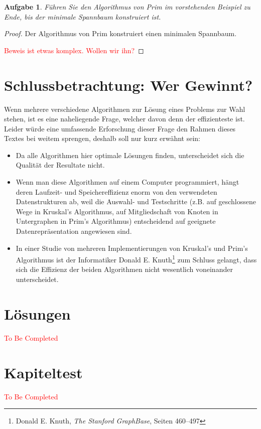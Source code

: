 \documentclass[12pt,a4paper]{report}
\theoremstyle{break}
\newtheorem{exercise}{Aufgabe}[section]
\theoremstyle{plain}
\newtheorem{proof}{Satz}[section]
\begin{document}
\begin{exercise}
F\"{u}hren Sie den Algorithmus von Prim im vorstehenden Beispiel zu
Ende, bis der minimale Spannbaum konstruiert ist.
\end{exercise}

\begin{proof}\label{primproof}Der Algorithmus von Prim konstruiert
  einen minimalen Spannbaum.

\textcolor{red}{Beweis ist etwas komplex. Wollen wir ihn?}
\end{proof}

\section{Schlussbetrachtung: Wer Gewinnt?}

Wenn mehrere verschiedene Algorithmen zur L\"{o}sung eines Problems
zur Wahl stehen, ist es eine naheliegende Frage, welcher davon denn
der effizienteste ist. Leider w\"{u}rde eine umfassende Erforschung dieser
Frage den Rahmen dieses Textes bei weitem sprengen, deshalb soll nur
kurz erw\"{a}hnt sein:

\begin{itemize}
\item Da alle Algorithmen hier optimale L\"{o}sungen finden,
  unterscheidet sich die Qualit\"{a}t der Resultate nicht.
\item Wenn man diese Algorithmen auf einem Computer programmiert,
  h\"{a}ngt deren Laufzeit- und Speichereffizienz enorm von den
  verwendeten Datenstrukturen ab, weil die Auswahl- und Testschritte
  (z.B. auf geschlossene Wege in Kruskal's Algorithmus, auf
  Mitgliedschaft von Knoten in Untergraphen in Prim's Algorithmus)
  entscheidend auf geeignete Datenrepr\"{a}sentation angewiesen sind.
\item In einer Studie von mehreren Implementierungen von Kruskal's und
  Prim's Algorithmus ist der Informatiker Donald
  E. Knuth\footnote{Donald E. Knuth, \emph{The Stanford GraphBase},
    Seiten 460--497} zum Schluss
  gelangt, dass sich die Effizienz der beiden Algorithmen nicht
  wesentlich voneinander unterscheidet.
\end{itemize}

\section{L\"{o}sungen}
\textcolor{red}{To Be Completed}
\section{Kapiteltest}
\textcolor{red}{To Be Completed}
\end{document}
